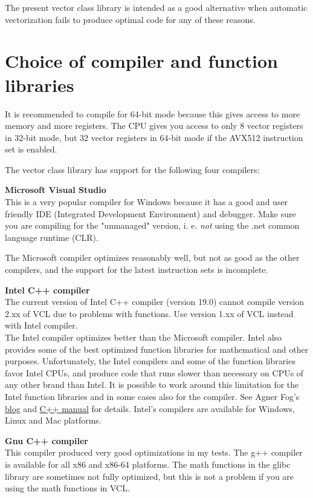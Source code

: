 \documentclass[vcl_manual.tex]{subfiles}
\begin{document}
The present vector class library is intended as a good alternative when automatic vectorization fails to produce optimal code for any of these reasons.


\section{Choice of compiler and function libraries}\label{ChoiceOfCompiler}

It is recommended to compile for 64-bit mode because this gives access to more memory and more registers. The CPU gives you access to only 8 vector registers in 32-bit mode, but 32 vector registers in 64-bit mode if the AVX512 instruction set is enabled.

The vector class library has support for the following four compilers:

\textbf{Microsoft Visual Studio}\\
This is a very popular compiler for Windows because it has a good and user friendly IDE (Integrated Development Environment) and debugger. Make sure you are compiling for the "unmanaged" version, i. e. \emph{not} using the .net common language runtime (CLR).

The Microsoft compiler optimizes reasonably well, but not as good as the other compilers, and the support for the latest instruction sets is incomplete.

\textbf{Intel C++ compiler}\\
The current version of Intel C++ compiler (version 19.0) cannot compile version 2.xx of VCL due to problems with  functions. Use version 1.xx of VCL instead with Intel compiler.\\
The Intel compiler optimizes better than the Microsoft compiler. Intel also provides some of the best optimized function libraries for mathematical and other purposes. Unfortunately, the Intel compilers and some of the function libraries favor Intel CPUs, and produce code that runs slower than necessary on CPUs of any other brand than Intel. It is possible to work around this limitation for the Intel function libraries and in some cases also for the compiler. 
See Agner Fog's \href{https://www.agner.org/optimize/blog/read.php?i=49}{blog} 
and \href{https://www.agner.org/optimize/#manual_cpp}{C++ manual} 
for details. Intel's compilers are available for Windows, Linux and Mac platforms.

\textbf{Gnu C++ compiler}\\
This compiler produced very good optimizations in my tests. The g++ compiler is available for all x86 and x86-64 platforms. The math functions in the glibc library are sometimes not fully optimized, but this is not a problem if you are using the math functions in VCL.
\end{document}

